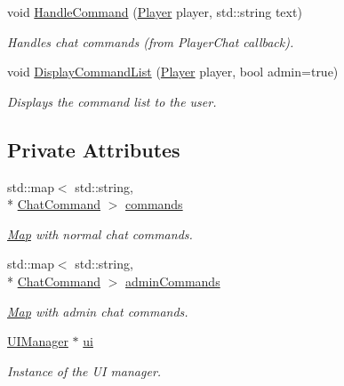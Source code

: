 \begin{DoxyCompactItemize}
void \hyperlink{classCommandManager_a42082bb9a76c725e58aa9c327dd41080}{Handle\-Command} (\hyperlink{structPlayer}{Player} player, std\-::string text)
\begin{DoxyCompactList}\small\item\em Handles chat commands (from Player\-Chat callback). \end{DoxyCompactList}\item 
void \hyperlink{classCommandManager_a463e9c8106c7c509d3c56134c673b767}{Display\-Command\-List} (\hyperlink{structPlayer}{Player} player, bool admin=true)
\begin{DoxyCompactList}\small\item\em Displays the command list to the user. \end{DoxyCompactList}\end{DoxyCompactItemize}
\subsection*{Private Attributes}
\begin{DoxyCompactItemize}
\item 
\hypertarget{classCommandManager_ac192b6e14a4c2c99deff93445f59b97b}{std\-::map$<$ std\-::string, \\*
\hyperlink{structChatCommand}{Chat\-Command} $>$ \hyperlink{classCommandManager_ac192b6e14a4c2c99deff93445f59b97b}{commands}}\label{classCommandManager_ac192b6e14a4c2c99deff93445f59b97b}

\begin{DoxyCompactList}\small\item\em \hyperlink{structMap}{Map} with normal chat commands. \end{DoxyCompactList}\item 
\hypertarget{classCommandManager_ad3d77a995f6ee7fc46c74a5ce146da34}{std\-::map$<$ std\-::string, \\*
\hyperlink{structChatCommand}{Chat\-Command} $>$ \hyperlink{classCommandManager_ad3d77a995f6ee7fc46c74a5ce146da34}{admin\-Commands}}\label{classCommandManager_ad3d77a995f6ee7fc46c74a5ce146da34}

\begin{DoxyCompactList}\small\item\em \hyperlink{structMap}{Map} with admin chat commands. \end{DoxyCompactList}\item 
\hypertarget{classCommandManager_a650cf2a7fc83f6ba193e3ba095c9bc33}{\hyperlink{classUIManager}{U\-I\-Manager} $\ast$ \hyperlink{classCommandManager_a650cf2a7fc83f6ba193e3ba095c9bc33}{ui}}\label{classCommandManager_a650cf2a7fc83f6ba193e3ba095c9bc33}

\begin{DoxyCompactList}\small\item\em Instance of the U\-I manager. \end{DoxyCompactList}\end{DoxyCompactItemize}


